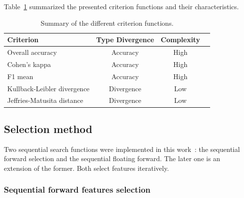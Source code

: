 \documentclass[journal,peerreview,onecolumn]{IEEEtran}
\begin{document}
        \vspace{10 mm}


        Table~\ref{tab:crit} summarized the presented criterion functions and their characteristics.

        \begin{table}[!t]
            \centering
            \caption{Summary of the different criterion functions.\label{tab:crit}}
            \begin{tabular}[b]{lccc}
              \toprule
              Criterion & Type Divergence & Complexity \\
              \midrule
              Overall accuracy            & Accuracy   & High \\
              Cohen's kappa               & Accuracy   & High\\
              F1 mean                     & Accuracy   & High\\
              \midrule
              Kullback-Leibler divergence & Divergence & Low \\
              Jeffries-Matusita distance  & Divergence & Low \\
              \bottomrule
            \end{tabular}
        \end{table}

        \subsection{Selection method}
        \label{sec:selection:method}
        Two  sequential  search  functions were  implemented  in  this
        work~\cite{Guyon:2006:FEF:1208773}:  the   sequential  forward
        selection and the sequential  floating forward.  The later one
        is  an   extension  of   the  former.  Both   select  features
        iteratively.

        \subsubsection{Sequential forward features selection}
        \label{sec:forward-presentation}
\end{document}
